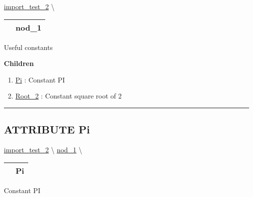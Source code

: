 \hypertarget{ecldoc:ML_Core.Constants}{}
\hspace{0pt} \hyperlink{ecldoc:import_test_2}{import_test_2} \textbackslash 

{\renewcommand{\arraystretch}{1.5}
\begin{tabularx}{\textwidth}{|>{\raggedright\arraybackslash}l|X|}
\hline
\hspace{0pt}\mytexttt{\color{red} } & \textbf{nod\_1} \\
\hline
\end{tabularx}
}

\par





Useful constants







\textbf{Children}
\begin{enumerate}
\item \hyperlink{ecldoc:ml_core.constants.pi}{Pi}
: Constant PI
\item \hyperlink{ecldoc:ml_core.constants.root_2}{Root\_2}
: Constant square root of 2
\end{enumerate}

\rule{\linewidth}{0.5pt}

\subsection*{\textsf{\colorbox{headtoc}{\color{white} ATTRIBUTE}
Pi}}

\hypertarget{ecldoc:ml_core.constants.pi}{}
\hspace{0pt} \hyperlink{ecldoc:import_test_2}{import_test_2} \textbackslash 
\hspace{0pt} \hyperlink{ecldoc:ML_Core.Constants}{nod_1} \textbackslash 

{\renewcommand{\arraystretch}{1.5}
\begin{tabularx}{\textwidth}{|>{\raggedright\arraybackslash}l|X|}
\hline
\hspace{0pt}\mytexttt{\color{red} } & \textbf{Pi} \\
\hline
\end{tabularx}
}

\par





Constant PI









